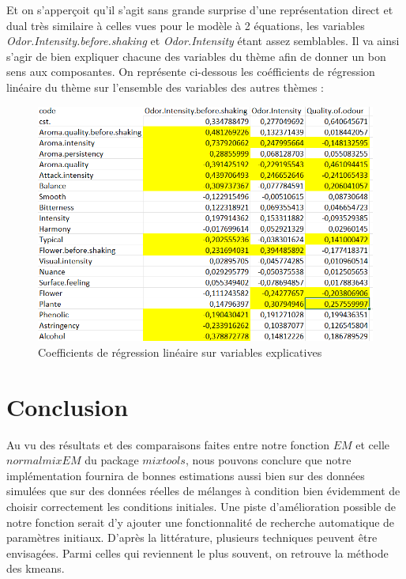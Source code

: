 \documentclass[a4paper,french,10pt]{article}
\begin{document}
Et on s'apperçoit qu'il s'agit sans grande surprise d'une représentation direct et dual très similaire à celles vues pour le modèle à 2 équations, les variables \textit{Odor.Intensity.before.shaking} et \textit{Odor.Intensity} étant assez semblables. Il va ainsi s'agir de bien expliquer chacune des variables du thème afin de donner un bon sens aux composantes. \newline 
On représente ci-dessous les coéfficients de régression linéaire du thème sur l'ensemble des variables des autres thèmes : 

\begin{figure}[htp] 
	\centering
	\includegraphics[scale=0.45]{images/Coeff_var_Cross.png}
	\caption{Coefficients de régression linéaire sur variables explicatives}
\end{figure}



\newpage

\section{Conclusion}

Au vu des résultats et des comparaisons faites entre notre fonction $EM$ et celle $normalmixEM$ du package $mixtools$, nous pouvons conclure que notre implémentation fournira de bonnes estimations aussi bien sur des données simulées que sur des données réelles de mélanges à condition bien évidemment de choisir correctement les conditions initiales. Une piste d'amélioration possible de notre fonction serait d'y ajouter une fonctionnalité de recherche automatique de paramètres initiaux. D'après la littérature, plusieurs techniques peuvent être envisagées. Parmi celles qui reviennent le plus souvent, on retrouve la méthode des kmeans.
\end{document}
